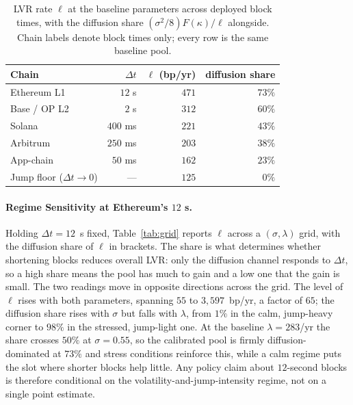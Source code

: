 \documentclass[runningheads]{llncs}
\newcommand{\dt}{\Delta t}
\newcommand{\1}{\mathbf{1}}
\begin{document}
\begin{table}[htbp]
\centering
\caption{LVR rate $\ell$ at the baseline parameters across deployed block times, with the diffusion share $(\sigma^2/8)F(\kappa)/\ell$ alongside. Chain labels denote block times only; every row is the same baseline pool.}\label{tab:chains}
\begin{tabular}{lrrr}
\toprule
Chain & $\dt$ & $\ell$ (bp/yr) & diffusion share \\
\midrule
Ethereum L1 & $12$ s & $471$ & $73\%$ \\
Base / OP L2 & $2$ s & $312$ & $60\%$ \\
Solana & $400$ ms & $221$ & $43\%$ \\
Arbitrum & $250$ ms & $203$ & $38\%$ \\
App-chain & $50$ ms & $162$ & $23\%$ \\
\midrule
Jump floor ($\dt\to 0$) & --- & $125$ & $0\%$ \\
\bottomrule
\end{tabular}
\end{table}

\paragraph{Regime Sensitivity at Ethereum's $12$ s.}
Holding $\dt = 12$~s fixed, Table~\ref{tab:grid} reports $\ell$ across a $(\sigma,\lambda)$ grid, with the diffusion share of $\ell$ in brackets. The share is what determines whether shortening blocks reduces overall LVR: only the diffusion channel responds to $\dt$, so a high share means the pool has much to gain and a low one that the gain is small. The two readings move in opposite directions across the grid. The level of $\ell$ rises with both parameters, spanning $55$ to $3{,}597$~bp/yr, a factor of $65$; the diffusion share rises with $\sigma$ but falls with $\lambda$, from $1\%$ in the calm, jump-heavy corner to $98\%$ in the stressed, jump-light one. At the baseline $\lambda=283$/yr the share crosses $50\%$ at $\sigma = 0.55$, so the calibrated pool is firmly diffusion-dominated at $73\%$ and stress conditions reinforce this, while a calm regime puts the slot where shorter blocks help little. Any policy claim about $12$-second blocks is therefore conditional on the volatility-and-jump-intensity regime, not on a single point estimate.
\end{document}
